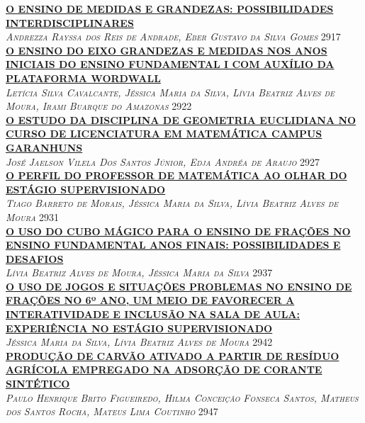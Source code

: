 \noindent \textsc{\hyperlink{trabalhos/250039.pdf.1}{\textbf{O ENSINO DE MEDIDAS E GRANDEZAS: POSSIBILIDADES INTERDISCIPLINARES }}}\\ 
\noindent \textsc{\textit{Andrezza Rayssa dos Reis de Andrade, Eber Gustavo da Silva Gomes}} \hfill 2917\\ 

\noindent \textsc{\hyperlink{trabalhos/249135.pdf.1}{\textbf{O ENSINO DO EIXO GRANDEZAS E MEDIDAS NOS ANOS INICIAIS DO ENSINO FUNDAMENTAL I COM AUXÍLIO DA PLATAFORMA WORDWALL}}}\\ 
\noindent \textsc{\textit{Letícia Silva Cavalcante, Jéssica Maria da Silva, Lívia Beatriz Alves de Moura, Irami Buarque do Amazonas}} \hfill 2922\\ 

\noindent \textsc{\hyperlink{trabalhos/251222.pdf.1}{\textbf{O ESTUDO DA DISCIPLINA DE GEOMETRIA EUCLIDIANA NO CURSO DE LICENCIATURA EM MATEMÁTICA CAMPUS GARANHUNS}}}\\ 
\noindent \textsc{\textit{José Jaelson Vilela Dos Santos Júnior, Edja Andréa de Araujo}} \hfill 2927\\ 

\noindent \textsc{\hyperlink{trabalhos/250076.pdf.1}{\textbf{O PERFIL DO PROFESSOR DE MATEMÁTICA AO OLHAR DO ESTÁGIO SUPERVISIONADO}}}\\ 
\noindent \textsc{\textit{Tiago Barreto de Morais, Jéssica Maria da Silva, Lívia Beatriz Alves de Moura}} \hfill 2931\\ 

\noindent \textsc{\hyperlink{trabalhos/249098.pdf.1}{\textbf{O USO DO CUBO MÁGICO PARA O ENSINO DE FRAÇÕES NO ENSINO FUNDAMENTAL ANOS FINAIS: POSSIBILIDADES E DESAFIOS}}}\\ 
\noindent \textsc{\textit{Lívia Beatriz Alves de Moura, Jéssica Maria da Silva}} \hfill 2937\\ 

\noindent \textsc{\hyperlink{trabalhos/249732.pdf.1}{\textbf{O USO DE JOGOS E SITUAÇÕES PROBLEMAS  NO ENSINO DE FRAÇÕES NO 6º ANO, UM MEIO DE FAVORECER A INTERATIVIDADE E INCLUSÃO NA SALA DE AULA: EXPERIÊNCIA NO ESTÁGIO SUPERVISIONADO }}}\\ 
\noindent \textsc{\textit{Jéssica Maria da Silva, Lívia Beatriz Alves de Moura}} \hfill 2942\\ 

\noindent \textsc{\hyperlink{trabalhos/249592.pdf.1}{\textbf{PRODUÇÃO DE CARVÃO ATIVADO A PARTIR DE RESÍDUO AGRÍCOLA EMPREGADO NA ADSORÇÃO DE CORANTE SINTÉTICO }}}\\ 
\noindent \textsc{\textit{Paulo Henrique Brito Figueiredo, Hilma Conceição Fonseca Santos, Matheus dos Santos Rocha, Mateus Lima Coutinho}} \hfill 2947\\ 

